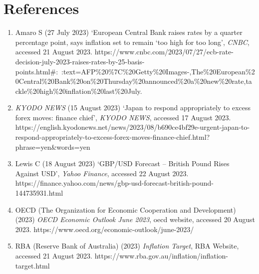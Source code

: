 \documentclass{article}
\begin{document}
\FloatBarrier

\section*{References}

    \begin{enumerate}
        \item Amaro S (27 July 2023) `European Central Bank raises rates by a quarter percentage point, says inflation set to remain `too high for too long', \textit{CNBC}, accessed 21 August 2023.
        https://www.cnbc.com/2023/07/27/ecb-rate-decision-july-2023-raises-rates-by-25-basis-points.html\#:~:text=AFP\%20\%7C\%20Getty\%20Images-,The\%20European\%20Central\%20Bank\%20on\%20Thursday\%20announced\%20a\%20new\%20rate,tackle\%20high\%20inflation\%20last\%20July.
        
        \item \textit{KYODO NEWS} (15 August 2023) `Japan to respond appropriately to excess forex moves: finance chief', \textit{KYODO NEWS}, accessed 17 August 2023.
        https://english.kyodonews.net/news/2023/08/b690ce4bf29e-urgent-japan-to-respond-appropriately-to-excess-forex-moves-finance-chief.html?phrase=yen\&words=yen
        
        \item Lewis C (18 August 2023) `GBP/USD Forecast – British Pound Rises Against USD', \textit{Yahoo Finance}, accessed 22 August 2023.
        https://finance.yahoo.com/news/gbp-usd-forecast-british-pound-144735931.html
        
        \item OECD (The Organization for Economic Cooperation and Development) (2023) \textit{OECD Economic Outlook June 2023}, oecd website, accessed 20 August 2023.
        https://www.oecd.org/economic-outlook/june-2023/
        
        \item RBA (Reserve Bank of Australia) (2023) \textit{Inflation Target}, RBA Website, accessed 21 August 2023.
        https://www.rba.gov.au/inflation/inflation-target.html
    \end{enumerate}
  
\end{document}
